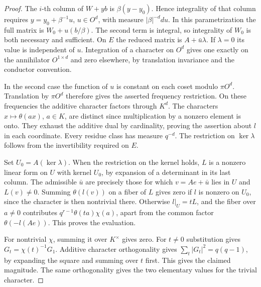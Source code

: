 \documentclass[a4paper,11pt]{article}
\theoremstyle{definition}
\theoremstyle{remark}
\numberwithin{equation}{section}
\begin{document}
\begin{proof}
The \(i\)-th column of \(W+yb\) is \(\beta(y-y_0)\).
Hence integrality of that column requires
\(y=y_0+\beta^{-1}u\), \(u\in O^d\), with measure
\(|\beta|^{-d}du\). In this parametrization the full matrix
is \(W_0+u(b/\beta)\). The second term is integral, so
integrality of \(W_0\) is both necessary and sufficient.
On \(E\) the reduced matrix is \(A+\bar u\lambda\).
If \(\lambda=0\) its value is independent of \(u\).
Integration of a character on \(O^d\) gives one exactly
on the annihilator \(O^{1\times d}\) and zero elsewhere,
by translation invariance and the conductor convention.

In the second case the function of \(u\) is constant on
each coset modulo \(\pi O^d\). Translation by \(\pi O^d\)
therefore gives the asserted frequency restriction. On these
frequencies the additive character factors through \(K^d\).
The characters \(x\mapsto\theta(ax)\), \(a\in K\), are distinct
since multiplication by a nonzero element is onto. They
exhaust the additive dual by cardinality, proving the assertion
about \(l\) in each coordinate. Every residue class has measure
\(q^{-d}\). The restriction on \(\ker\lambda\) follows from
the invertibility required on \(E\).

Set \(U_0=A(\ker\lambda)\). When the restriction on the
kernel holds, \(L\) is a nonzero linear form on \(U\) with
kernel \(U_0\), by expansion of a determinant in its last
column. The admissible \(\bar u\) are precisely those for which
\(v=Ae+\bar u\) lies in \(U\) and \(L(v)\ne0\). Summing
\(\theta(l(v))\) on a fiber of \(L\) gives zero if \(l\) is
nonzero on \(U_0\), since the character is then nontrivial
there. Otherwise \(l|_U=tL\), and the fiber over \(a\ne0\)
contributes \(q^{r-1}\theta(ta)\chi(a)\), apart from the
common factor \(\theta(-l(Ae))\). This proves the evaluation.

For nontrivial \(\chi\), summing it over \(K^\times\) gives
zero. For \(t\ne0\) substitution gives
\(G_t=\chi(t)^{-1}G_1\). Additive character orthogonality gives
\(\sum_t |G_t|^2=q(q-1)\), by expanding the square and summing
over \(t\) first. This gives the claimed magnitude. The same
orthogonality gives the two elementary values for the trivial
character.
\end{proof}
\end{document}
